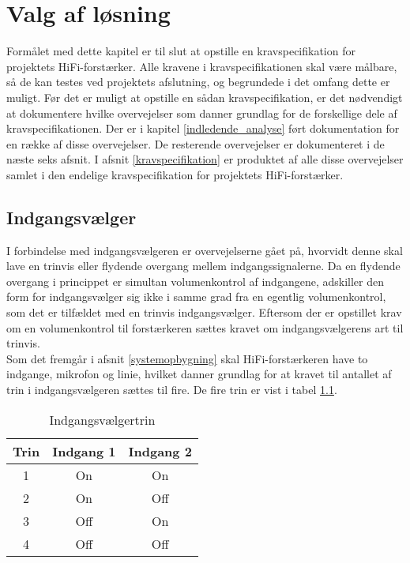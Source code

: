 \chapter{Valg af løsning}
\label{valgafloesning}
Formålet med dette kapitel er til slut at opstille en kravspecifikation for projektets HiFi-forstærker. Alle kravene i kravspecifikationen skal være målbare, så de kan testes ved projektets afslutning, og begrundede i det omfang dette er muligt. Før det er muligt at opstille en sådan kravspecifikation, er det nødvendigt at dokumentere hvilke overvejelser som danner grundlag for de forskellige dele af kravspecifikationen. Der er i kapitel \ref{indledende_analyse} ført dokumentation for en række af disse overvejelser. De resterende overvejelser er dokumenteret i de næste seks afsnit. I afsnit \ref{kravspecifikation} er produktet af alle disse overvejelser samlet i den endelige kravspecifikation for projektets HiFi-forstærker. 

\section{Indgangsvælger}
\label{valg_indgangsvaelger}
I forbindelse med indgangsvælgeren er overvejelserne gået på, hvorvidt denne skal lave en trinvis eller flydende overgang mellem indgangssignalerne. Da en flydende overgang i princippet er simultan volumenkontrol af indgangene, adskiller den form for indgangsvælger sig ikke i samme grad fra en egentlig volumenkontrol, som det er tilfældet med en trinvis indgangsvælger. Eftersom der er opstillet krav om en volumenkontrol til forstærkeren sættes kravet om indgangsvælgerens art til trinvis. \\
Som det fremgår i afsnit \ref{systemopbygning} skal HiFi-forstærkeren have to indgange, mikrofon og linie, hvilket danner grundlag for at kravet til antallet af trin i indgangsvælgeren sættes til fire. De fire trin er vist i tabel \ref{tab:indgangsvaelgertrin}.

\begin{table}[h]
\centering
\begin{tabular}{c|c|c}
\hline\hline
Trin & Indgang 1 & Indgang 2 \\
\hline\hline
1 & On & On \\
2 & On & Off \\
3 & Off & On \\
4 & Off & Off \\
\hline\hline
\end{tabular}
\caption{Indgangsvælgertrin}
\label{tab:indgangsvaelgertrin}
\end{table}

